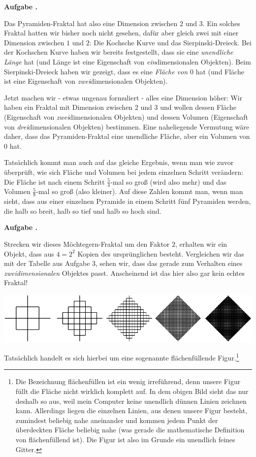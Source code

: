 \documentclass[a4paper,ngerman,12pt]{scrartcl}
\theoremstyle{definition}
\theoremstyle{plain}
\theoremstyle{remark}
\newlength{\aufgabenskip}
\newcounter{aufgabennummer}
\newenvironment{aufgabe}[1]{
  \addtocounter{aufgabennummer}{1}
  \textbf{Aufgabe \theaufgabennummer.} \emph{#1} \par
}{\vspace{\aufgabenskip}}
\begin{document}
\newpage
\begin{aufgabe}{}
	Das Pyramiden-Fraktal hat also eine Dimension zwischen $2$ und $3$. Ein solches Fraktal hatten wir bisher noch nicht gesehen, dafür aber gleich zwei mit einer Dimension zwischen $1$ und $2$: Die Kochsche Kurve und das Sierpinski-Dreieck. Bei der Kochschen Kurve haben wir bereits festgestellt, dass sie eine \emph{unendliche Länge} hat (und Länge ist eine Eigenschaft von \emph{ein}dimensionalen Objekten). Beim Sierpinski-Dreieck haben wir gezeigt, dass es eine \emph{Fläche von $0$} hat (und Fläche ist eine Eigenschaft von \emph{zwei}dimensionalen Objekten).
	
	Jetzt machen wir - etwas ungenau formuliert - \glqq alles eine Dimension höher\grqq: Wir haben ein Fraktal mit Dimension zwischen $2$ und $3$ und wollen dessen Fläche (Eigenschaft von \emph{zwei}dimensionalen Objekten) und dessen Volumen (Eigenschaft von \emph{drei}dimensionalen Objekten) bestimmen. Eine naheliegende Vermutung wäre daher, dass das Pyramiden-Fraktal eine unendliche Fläche, aber ein Volumen von $0$ hat.
	
	Tatsächlich kommt man auch auf das gleiche Ergebnis, wenn man wie zuvor überprüft, wie sich Fläche und Volumen bei jedem einzelnen Schritt verändern:
	Die Fläche ist nach einem Schritt $\frac{5}{4}$-mal so groß (wird also mehr) und das Volumen $\frac{5}{8}$-mal so groß (also kleiner). Auf diese Zahlen kommt man, wenn man sieht, dass aus einer einzelnen Pyramide in einem Schritt fünf Pyramiden werden, die halb so breit, halb so tief und halb so hoch sind.
\end{aufgabe}

\begin{aufgabe}{}
	Strecken wir dieses Möchtegern-Fraktal um den Faktor $2$, erhalten wir ein Objekt, dass aus $4 = 2^2$ Kopien des ursprünglichen besteht. Vergleichen wir das mit der Tabelle aus Aufgabe 3, sehen wir, dass das gerade zum Verhalten eines \emph{zweidimensionalen} Objektes passt. Anscheinend ist das hier also gar kein \glqq echtes Fraktal\grqq!
	
	\begin{center}
		\includegraphics[width=.6\textwidth]{Bilder/Nicht-Fraktal-mehr-Schritte.pdf}
	\end{center}	
	
	Tatsächlich handelt es sich hierbei um eine sogenannte \glqq flächenfüllende\grqq{} Figur.\footnote{Die Bezeichnung \glqq flächenfüllen\grqq{} ist ein wenig irreführend, denn unsere Figur füllt die Fläche nicht wirklich komplett auf. In dem obigen Bild sieht das nur deshalb so aus, weil mein Computer keine unendlich dünnen Linien zeichnen kann. Allerdings liegen die einzelnen Linien, aus denen unsere Figur besteht, zumindest \glqq beliebig nahe aneinander\grqq{} und kommen jedem Punkt der überdeckten Fläche \glqq beliebig nahe (was gerade die mathematische Definition von \glqq flächenfüllend\grqq{} ist). Die Figur ist also im Grunde ein unendlich feines Gitter.} 
\end{aufgabe}
\end{document}
